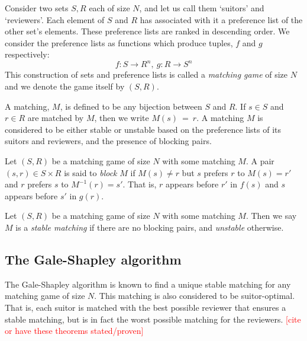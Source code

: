 \begin{definition}\label{def:matching_game}
    Consider two sets \(S, R\) each of size \(N\), and let us call them 
    `suitors' and `reviewers'. Each element of \(S\) and \(R\) has associated 
    with it a preference list of the other set's elements. These preference 
    lists are ranked in descending order. We consider the preference lists as 
    functions which produce tuples, \(f\) and \(g\) respectively:
	\[
	    f : S \to R^n, \ g : R \to S^n
	\]
	This construction of sets and preference lists is called a 
    \emph{matching game} of size \(N\) and we denote the game itself by 
    \((S,R)\).
	
    A matching, \(M\), is defined to be any bijection between \(S\) and \(R\). 
    If \(s \in S\) and \(r \in R\) are matched by \(M\), then we write
    \(M(s)~=~r\). A matching \(M\) is considered to be either stable or unstable
    based on the preference lists of its suitors and reviewers, and the presence
    of blocking pairs.
\end{definition}

\begin{definition}\label{def:blocking_pair}
    Let \((S, R)\) be a matching game of size \(N\) with some matching \(M\). A 
    pair \((s, r) \in S \times R\) is said to \emph{block} \(M\) if \(M(s) \neq
    r\) but \(s\) prefers \(r\) to \(M(s) = r'\) and \(r\) prefers \(s\) to
    \(M^{-1}(r) = s'\). That is, \(r\) appears before \(r'\) in \(f(s)\) and
    \(s\) appears before \(s'\) in \(g(r)\).
\end{definition}

\begin{definition}\label{def:stable_matching}
    Let \((S, R)\) be a matching game of size \(N\) with some matching \(M\). 
    Then we say \(M\) is a \emph{stable matching} if there are no blocking 
    pairs, and \emph{unstable} otherwise.
\end{definition}

%

\subsection{The Gale-Shapley algorithm}\label{subsec:galeshapley}

The Gale-Shapley algorithm is known to find a unique stable matching for any 
matching game of size \(N\). This matching is also considered to be 
suitor-optimal. That is, each suitor is matched with the best possible reviewer
that ensures a stable matching, but is in fact the worst possible matching for 
the reviewers. \textcolor{red}{[cite or have these theorems stated/proven]} 

